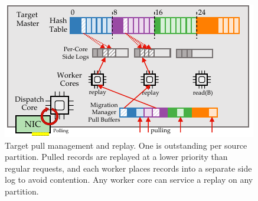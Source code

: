 \begin{figure}[t]
\centering
\includegraphics[width=0.9\columnwidth]{figures/rocksteady-target.pdf}
\caption{Target pull management and replay. One \pull is
  outstanding per source partition. Pulled records are replayed
  at a lower priority than regular requests,
  and each worker places records into
  a separate side log to avoid contention. Any worker core can service a
  replay on any partition.}%
\label{fig:rtarget}%
\end{figure}

